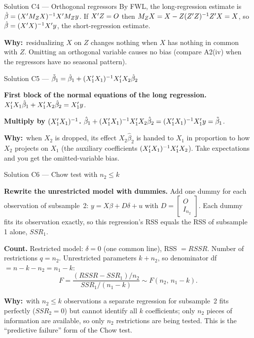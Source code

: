 \documentclass[11pt]{article}
\newcommand{\step}[1]{\par\smallskip\noindent\textbf{\textcolor{qnavy}{#1}}\quad\ignorespaces}
\newcommand{\Why}{\textbf{\textcolor{whyline}{Why:}}\ }
\begin{document}
\begin{solbox}{Solution C4 --- Orthogonal regressors}
By FWL, the long-regression estimate is $\hat\beta = (X^{\prime} M_{Z}X)^{-1}X^{\prime} M_{Z}y$. If
$X^{\prime} Z = O$ then $M_{Z}X = X - Z(Z^{\prime} Z)^{-1}Z^{\prime} X = X$, so $\hat\beta = (X^{\prime} X)^{-1}X^{\prime} y$,
the short-regression estimate.
\begin{why}\Why residualizing $X$ on $Z$ changes nothing when $X$ has nothing in common
with $Z$. Omitting an orthogonal variable causes no bias (compare A2(iv) when the
regressors have no seasonal pattern).\end{why}
\end{solbox}

\begin{solbox}{Solution C5 --- $\tilde\beta_{1} = \hat\beta_{1} + (X_{1}^{\prime} X_{1})^{-1}X_{1}^{\prime} X_{2}\hat\beta_{2}$}
\step{First block of the normal equations of the long regression.}
$X_{1}^{\prime} X_{1}\hat\beta_{1} + X_{1}^{\prime} X_{2}\hat\beta_{2} = X_{1}^{\prime} y$.
\step{Multiply by $(X_{1}^{\prime} X_{1})^{-1}$.}
$\hat\beta_{1} + (X_{1}^{\prime} X_{1})^{-1}X_{1}^{\prime} X_{2}\hat\beta_{2} = (X_{1}^{\prime} X_{1})^{-1}X_{1}^{\prime} y = \tilde\beta_{1}$.
\begin{why}\Why when $X_{2}$ is dropped, its effect $X_{2}\hat\beta_{2}$ is handed to $X_{1}$
in proportion to how $X_{2}$ projects on $X_{1}$ (the auxiliary coefficients
$(X_{1}^{\prime} X_{1})^{-1}X_{1}^{\prime} X_{2}$). Take expectations and you get the omitted-variable bias.\end{why}
\end{solbox}

\begin{solbox}{Solution C6 --- Chow test with $n_{2} \le k$}
\step{Rewrite the unrestricted model with dummies.} Add one dummy for each observation of
subsample~2: $y = X\beta + D\delta + u$ with $D = \begin{bmatrix} O \\ I_{n_{2}}\end{bmatrix}$. Each
dummy fits its observation exactly, so this regression's RSS equals the RSS of subsample 1
alone, $SSR_{1}$.
\step{Count.} Restricted model: $\delta = 0$ (one common line), RSS $= RSSR$. Number of
restrictions $q = n_{2}$. Unrestricted parameters $k + n_{2}$, so denominator df
$= n - k - n_{2} = n_{1} - k$:
\[
  F = \frac{(RSSR - SSR_{1})/n_{2}}{SSR_{1}/(n_{1} - k)} \sim F(n_{2},\, n_{1} - k).
\]
\begin{why}\Why with $n_{2} \le k$ observations a separate regression for subsample~2 fits
perfectly ($SSR_{2} = 0$) but cannot identify all $k$ coefficients; only $n_{2}$ pieces of
information are available, so only $n_{2}$ restrictions are being tested. This is the
``predictive failure'' form of the Chow test.\end{why}
\end{solbox}
\end{document}
